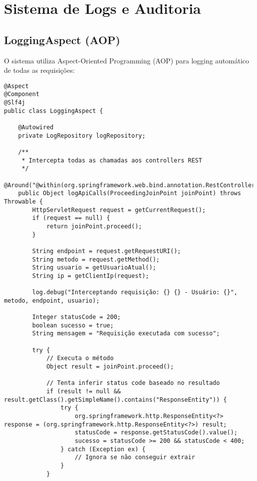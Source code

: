 \documentclass[12pt,a4paper]{article}
\begin{document}
\section{Sistema de Logs e Auditoria}

\subsection{LoggingAspect (AOP)}

O sistema utiliza Aspect-Oriented Programming (AOP) para logging automático de todas as requisições:

\begin{lstlisting}[caption=LoggingAspect - Logging Automático]
@Aspect
@Component
@Slf4j
public class LoggingAspect {
    
    @Autowired
    private LogRepository logRepository;
    
    /**
     * Intercepta todas as chamadas aos controllers REST
     */
    @Around("@within(org.springframework.web.bind.annotation.RestController)")
    public Object logApiCalls(ProceedingJoinPoint joinPoint) throws Throwable {
        HttpServletRequest request = getCurrentRequest();
        if (request == null) {
            return joinPoint.proceed();
        }
        
        String endpoint = request.getRequestURI();
        String metodo = request.getMethod();
        String usuario = getUsuarioAtual();
        String ip = getClientIp(request);
        
        log.debug("Interceptando requisição: {} {} - Usuário: {}", metodo, endpoint, usuario);
        
        Integer statusCode = 200;
        boolean sucesso = true;
        String mensagem = "Requisição executada com sucesso";
        
        try {
            // Executa o método
            Object result = joinPoint.proceed();
            
            // Tenta inferir status code baseado no resultado
            if (result != null && result.getClass().getSimpleName().contains("ResponseEntity")) {
                try {
                    org.springframework.http.ResponseEntity<?> response = (org.springframework.http.ResponseEntity<?>) result;
                    statusCode = response.getStatusCode().value();
                    sucesso = statusCode >= 200 && statusCode < 400;
                } catch (Exception ex) {
                    // Ignora se não conseguir extrair
                }
            }
            

\end{lstlisting}
\end{document}
